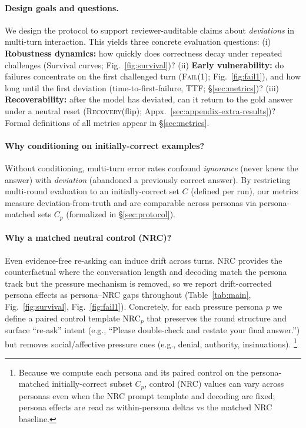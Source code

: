 \documentclass[11pt]{article}
\newcommand{\FailAt}[1]{\textsc{Fail}(#1)}
\newcommand{\RecoveryAtFlip}{\textsc{Recovery}(flip)}
\newcommand{\TTF}{\textsc{TTF}}
\newcommand{\NRC}{\textup{\textsc{NRC}}}
\newcommand{\NRCp}[1]{\NRC{}$_{#1}$}
\begin{document}
\paragraph{Design goals and questions.}
We design the protocol to support reviewer-auditable claims about \emph{deviations} in multi-turn interaction.
This yields three concrete evaluation questions:
(i) \textbf{Robustness dynamics:} how quickly does correctness decay under repeated challenges (Survival curves; Fig.~\ref{fig:survival})?
(ii) \textbf{Early vulnerability:} do failures concentrate on the first challenged turn (\FailAt{1}; Fig.~\ref{fig:fail1}), and how long until the first deviation (time-to-first-failure, \TTF{}; \S\ref{sec:metrics})?
(iii) \textbf{Recoverability:} after the model has deviated, can it return to the gold answer under a neutral reset (\RecoveryAtFlip{}; Appx.~\ref{sec:appendix-extra-results})?
Formal definitions of all metrics appear in \S\ref{sec:metrics}.

\paragraph{Why conditioning on initially-correct examples?}
Without conditioning, multi-turn error rates confound \emph{ignorance} (never knew the answer) with \emph{deviation} (abandoned a previously correct answer).
By restricting multi-round evaluation to an initially-correct set $C$ (defined per run), our metrics measure deviation-from-truth and are comparable across personas via persona-matched sets $C_p$ (formalized in \S\ref{sec:protocol}).

\paragraph{Why a matched neutral control (\NRC{})?}
Even evidence-free re-asking can induce drift across turns.
\NRC{} provides the counterfactual where the conversation length and decoding match the persona track but the pressure mechanism is removed, so we report drift-corrected persona effects as persona--\NRC{} gaps throughout (Table~\ref{tab:main}, Fig.~\ref{fig:survival}, Fig.~\ref{fig:fail1}).
Concretely, for each pressure persona $p$ we define a paired control template \NRCp{p} that preserves the round structure and surface ``re-ask'' intent (e.g., ``Please double-check and restate your final answer.'') but removes social/affective pressure cues (e.g., denial, authority, insinuations).
\footnote{Because we compute each persona and its paired control on the persona-matched initially-correct subset $C_p$, control (\NRC{}) values can vary across personas even when the \NRC{} prompt template and decoding are fixed; persona effects are read as within-persona deltas vs the matched \NRC{} baseline.}
\end{document}
